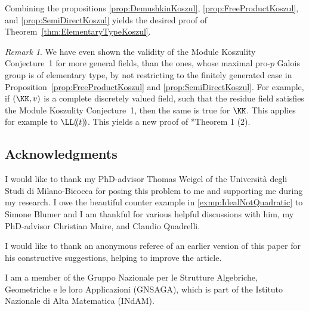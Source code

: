 \documentclass{amsart}
\theoremstyle{definition}
\theoremstyle{remark}
\newtheorem{rem}[thm]{Remark}
\numberwithin{equation}{section}
\begin{document}
Combining the propositions \ref{prop:DemushkinKoszul}, \ref{prop:FreeProductKoszul}, and \ref{prop:SemiDirectKoszul} yields the desired proof of Theorem~\ref{thm:ElementaryTypeKoszul}.

\begin{rem}
    We have even shown the validity of the Module Koszulity Conjecture~1 for more general fields, than the ones, whose maximal pro-$p$ Galois group is of elementary type, by not restricting to the finitely generated case in Proposition~\ref{prop:FreeProductKoszul} and \ref{prop:SemiDirectKoszul}. For example, if $(\KK,v)$ is a complete discretely valued field, such that the residue field satisfies the Module Koszulity Conjecture~1, then the same is true for $\KK$. This applies for example to $\LL(\!(t)\!)$. This yields a new proof of \cite{Positselski2014}*{Theorem 1 (2)}.
\end{rem}



\subsection*{Acknowledgments} I would like to thank my PhD-advisor Thomas Weigel of the Università degli Studi di Milano-Bicocca for posing this problem to me and supporting me during my research. I owe the beautiful counter example in \ref{exmp:IdealNotQuadratic} to Simone Blumer and I am thankful for various helpful discussions with him, my PhD-advisor Christian Maire, and Claudio Quadrelli. 

I would like to thank an anonymous referee of an earlier version of this paper for his constructive suggestions, helping to improve the article.

I am a member of the Gruppo Nazionale per le Strutture Algebriche, Geometriche e le loro Applicazioni (GNSAGA), which is part of the Istituto Nazionale di Alta Matematica (INdAM). 


\end{document}
